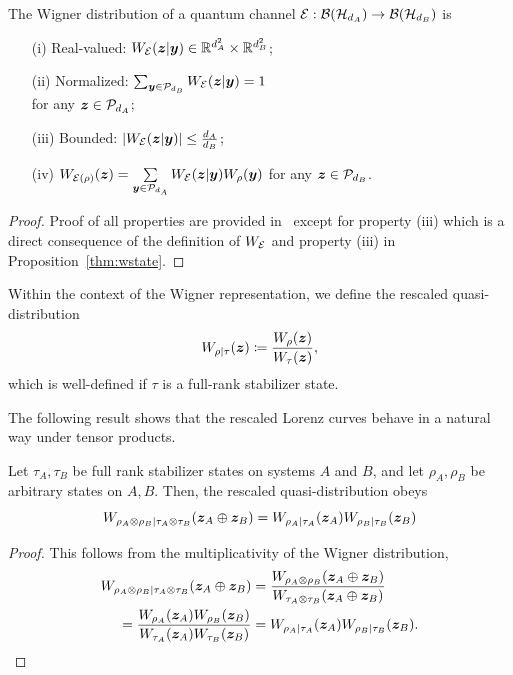 \documentclass[pra,
aps,
twocolumn,
superscriptaddress,
groupedaddress,
nofootinbib,
reprint
]{revtex4-1}
\begin{document}
\begin{proposition}
    \label{thm:wchannel}
    The Wigner distribution of a quantum channel ${\mathcal E}: \mathcal{B}(\mathcal{H}_{d_A}) \rightarrow \mathcal{B}(\mathcal{H}_{d_B})$ is
    \begin{enumerate}
        \item[(i)]\label{en:wo1} Real-valued: $\W{\E}(\bmz|\bmy) \in \mathbb{R}^{d_A^2} \times \mathbb{R}^{d_B^2}$;
        \item[(ii)]\label{en:wo2} Normalized: $\sum_{\bmy \in \cal{P}_{d_{\scalebox{.9}{$\scriptscriptstyle B$}}}} \W[\bmz|\bmy]{\E} = 1$ \\ 
        for any $\bm{z} \in \mathcal{P}_{d_A}$;
        \item[(iii)]\label{en:wo3} Bounded: $\abs{\W[\bmz|\bmy]{\E}} \leq \frac{d_A}{d_B}$;
	    \item[(iv)]\label{en:wo4} $\W[\bmz]{\E(\rho)} = \sum\limits_{\bmy \in \cal{P}_{d_{A}}} \W[\bmz|\bmy]{\E} \W[\bmy]{\rho}$ for any $\bm{z} \in \mathcal{P}_{d_B}$.
    \end{enumerate}
\end{proposition}
\begin{proof}
	Proof of all properties are provided in~\cite{Wang_2019} except for property (iii) which is a direct consequence of the definition of $\W{\E}$ and property (iii) in Proposition~\ref{thm:wstate}.
\end{proof}

Within the context of the Wigner representation, we define the rescaled quasi-distribution
\begin{equation}
	W_{\rho|\tau}(\bm{z}) \coloneqq \frac{W_\rho (\bm{z}) }{ W_\tau(\bm{z})},
\end{equation}
which is well-defined if $\tau$ is a full-rank stabilizer state.

The following result shows that the rescaled Lorenz curves behave in a natural way under tensor products. 
\begin{proposition}\label{prop:rescaled_multi}
	Let $\tau_A, \tau_B$ be full rank stabilizer states on systems $A$ and $B$, and let $\rho_A, \rho_B$ be arbitrary states on $A,B$. Then, the rescaled quasi-distribution obeys
\begin{equation}
W_{\rho_A \otimes \rho_B | \tau_A \otimes \tau_B}(\bm{z}_A \oplus \bm{z}_B) =W_{\rho_A | \tau_A}(\bm{z}_A) W_{\rho_B | \tau_B}(\bm{z}_B)
\end{equation}
\end{proposition}
\begin{proof} This follows from the multiplicativity of the Wigner distribution,
\begin{align}
W_{\rho_A \otimes \rho_B | \tau_A \otimes \tau_B}(\bm{z}_A \oplus \bm{z}_B) &= \frac{W_{\rho_A \otimes \rho_B} (\bm{z}_A \oplus \bm{z}_B)}{W_{\tau_A \otimes \tau_B} (\bm{z}_A \oplus \bm{z}_B)}\nonumber \\
 = \frac{W_{\rho_A } (\bm{z}_A )W_{\rho_B } (\bm{z}_B )}{W_{\tau_A } (\bm{z}_A )W_{\tau_B } (\bm{z}_B )} &= W_{\rho_A | \tau_A}(\bm{z}_A) W_{\rho_B | \tau_B}(\bm{z}_B). \nonumber
\end{align}
\end{proof}
\end{document}
